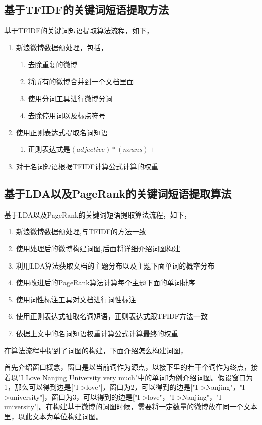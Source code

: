 \documentclass[master]{njuthesis}
\begin{document}
\subsection{基于TFIDF的关键词短语提取方法}
基于TFIDF的关键词短语提取算法流程，如下，
\begin{enumerate}
\item 新浪微博数据预处理，包括，
\begin{enumerate}
\item 去除重复的微博
\item 将所有的微博合并到一个文档里面
\item 使用分词工具进行微博分词
\item 去除停用词以及标点符号
\end{enumerate}
\item 使用正则表达式提取名词短语
\begin{enumerate}
\item 正则表达式是$\left(adjective\right)*\left(nouns\right)+$
\end{enumerate}
\item 对于名词短语根据TFIDF计算公式计算的权重
\end{enumerate} 

\subsection{基于LDA以及PageRank的关键词短语提取算法}
基于LDA以及PageRank的关键词短语提取算法流程，如下，
\begin{enumerate}
\item 新浪微博数据预处理,与TFIDF的方法一致
\item 使用处理后的微博构建词图,后面将详细介绍词图构建
\item 利用LDA算法获取文档的主题分布以及主题下面单词的概率分布
\item 使用改进后的PageRank算法计算每个主题下面的单词排序
\item 使用词性标注工具对文档进行词性标注
\item 使用正则表达式抽取名词短语，正则表达式跟TFIDF方法一致
\item 依据上文中的名词短语权重计算公式计算最终的权重
\end{enumerate}
在算法流程中提到了词图的构建，下面介绍怎么构建词图，

首先介绍窗口概念，窗口是以当前词作为源点，以接下里的若干个词作为终点，接着以"I Love Nanjing University very much"中的单词I为例介绍词图。假设窗口为1，那么可以得到边是["I->love"]，窗口为2，可以得到的边是["I->Nanjing"，"I->university"]，窗口为3，可以得到的边是["I->love"，"I->Nanjing"，"I-university"]。在构建基于微博的词图时候，需要将一定数量的微博放在同一个文本里，以此文本为单位构建词图。
\end{document}
